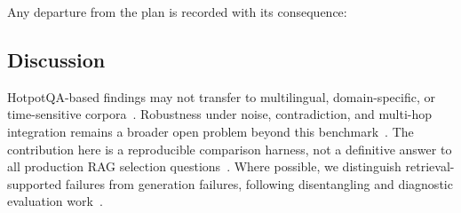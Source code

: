 Any departure from the plan is recorded with its consequence:




\subsection{Discussion}

HotpotQA-based findings may not transfer to multilingual,
domain-specific, or time-sensitive corpora~\cite{elkiran2026empirical,zeng2025rare,li2025biomedical}.
Robustness under noise, contradiction, and multi-hop integration remains
a broader open problem beyond this benchmark~\cite{chen2023rgb,zeng2025rare,li2025biomedical}.
The contribution here is a reproducible comparison harness, not a
definitive answer to all production RAG selection questions~\cite{wu2024survey,sharma2025survey}.
Where possible, we distinguish retrieval-supported failures from
generation failures, following disentangling and diagnostic evaluation
work~\cite{mala2026faithfulness,murugaraj2025ragvue}.
